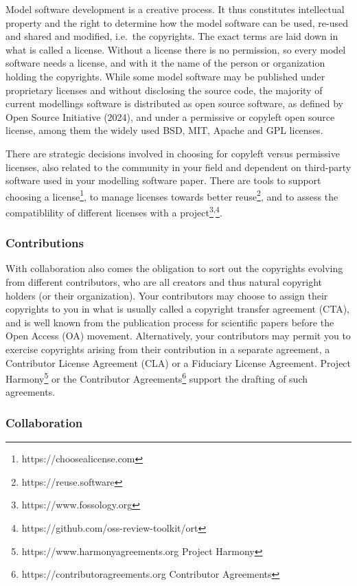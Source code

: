 \documentclass[preprint,11pt,5p]{elsarticle}
\begin{document}
Model software development is a creative process. It thus constitutes
intellectual property and the right to determine how the model software
can be used, re-used and shared and modified, i.e.~the copyrights. The
exact terms are laid down in what is called a license. Without a license
there is no permission, so every model software needs a license, and
with it the name of the person or organization holding the copyrights.
While some model software may be published under proprietary licenses
and without disclosing the source code, the majority of current
modellings software is distributed as open source software, as defined
by Open Source Initiative (2024), and under a permissive or copyleft
open source license, among them the widely used BSD, MIT, Apache and GPL
licenses.

There are strategic decisions involved in choosing for copyleft versus
permissive licenses, also related to the community in your field and
dependent on third-party software used in your modelling software paper.
There are tools to support choosing a license\footnote{https://choosealicense.com},
to manage licenses towards better reuse\footnote{https://reuse.software},
and to assess the compatiblility of different licenses with a
project\footnote{https://www.fossology.org}\textsuperscript{,}\footnote{https://github.com/oss-review-toolkit/ort}.

\subsubsection{Contributions}\label{contributions}

With collaboration also comes the obligation to sort out the copyrights
evolving from different contributors, who are all creators and thus
natural copyright holders (or their organization). Your contributors may
choose to assign their copyrights to you in what is usually called a
copyright transfer agreement (CTA), and is well known from the
publication process for scientific papers before the Open Access (OA)
movement. Alternatively, your contributors may permit you to exercise
copyrights arising from their contribution in a separate agreement, a
Contributor License Agreement (CLA) or a Fiduciary License Agreement.
Project Harmony\footnote{https://www.harmonyagreements.org Project
  Harmony} or the Contributor Agreements\footnote{https://contributoragreements.org
  Contributor Agreements} support the drafting of such agreements.

\subsubsection{Collaboration}\label{collaboration}
\end{document}

